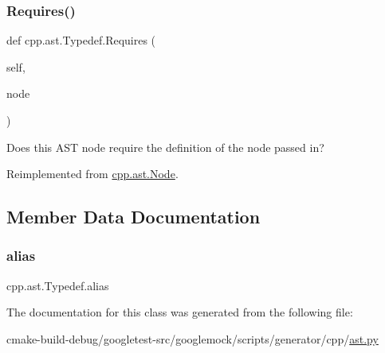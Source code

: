 \subsubsection{\texorpdfstring{Requires()}{Requires()}}
{\footnotesize\ttfamily def cpp.\+ast.\+Typedef.\+Requires (\begin{DoxyParamCaption}\item[{}]{self,  }\item[{}]{node }\end{DoxyParamCaption})}

\begin{DoxyVerb}Does this AST node require the definition of the node passed in?\end{DoxyVerb}
 

Reimplemented from \mbox{\hyperlink{classcpp_1_1ast_1_1Node_a31ae211f954a8c578ef16226df5ac8c8}{cpp.\+ast.\+Node}}.



\subsection{Member Data Documentation}
\mbox{\label{classcpp_1_1ast_1_1Typedef_a3187a504dfbefe50b866b44902823c30}} 
\subsubsection{\texorpdfstring{alias}{alias}}
{\footnotesize\ttfamily cpp.\+ast.\+Typedef.\+alias}



The documentation for this class was generated from the following file\+:\begin{DoxyCompactItemize}
\item 
cmake-\/build-\/debug/googletest-\/src/googlemock/scripts/generator/cpp/\mbox{\hyperlink{ast_8py}{ast.\+py}}\end{DoxyCompactItemize}
